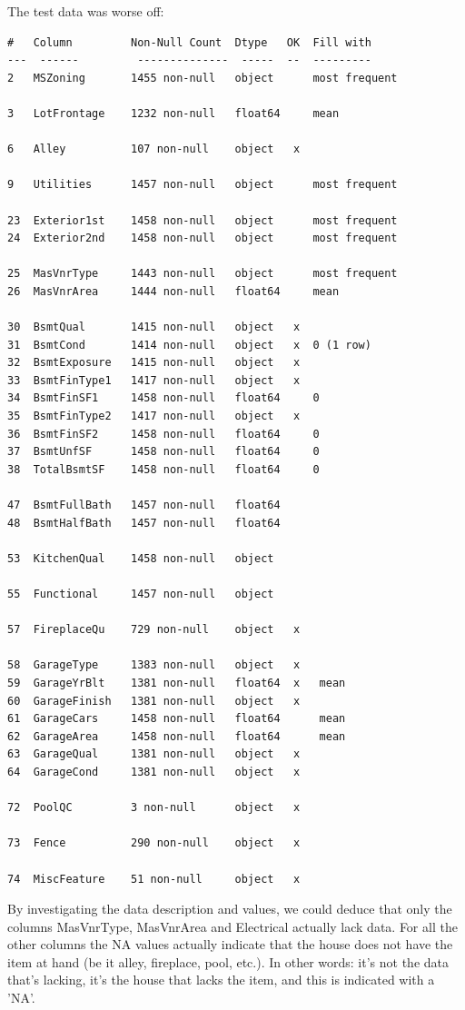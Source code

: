 \documentclass[a4paper, 12pt, twoside]{report}
\begin{document}
The test data was worse off:
\begin{Verbatim}[commandchars=\\\{\}]
#   Column         Non-Null Count  Dtype   OK  Fill with
---  ------         --------------  -----  --  ---------
2   MSZoning       1455 non-null   object      most frequent

3   LotFrontage    1232 non-null   float64     mean

6   Alley          107 non-null    object   x

9   Utilities      1457 non-null   object      most frequent

23  Exterior1st    1458 non-null   object      most frequent
24  Exterior2nd    1458 non-null   object      most frequent

25  MasVnrType     1443 non-null   object      most frequent
26  MasVnrArea     1444 non-null   float64     mean

30  BsmtQual       1415 non-null   object   x
31  BsmtCond       1414 non-null   object   x  0 (1 row)
32  BsmtExposure   1415 non-null   object   x
33  BsmtFinType1   1417 non-null   object   x                          
34  BsmtFinSF1     1458 non-null   float64     0
35  BsmtFinType2   1417 non-null   object   x  
36  BsmtFinSF2     1458 non-null   float64     0
37  BsmtUnfSF      1458 non-null   float64     0
38  TotalBsmtSF    1458 non-null   float64     0

47  BsmtFullBath   1457 non-null   float64
48  BsmtHalfBath   1457 non-null   float64

53  KitchenQual    1458 non-null   object 

55  Functional     1457 non-null   object 

57  FireplaceQu    729 non-null    object   x

58  GarageType     1383 non-null   object   x
59  GarageYrBlt    1381 non-null   float64  x   mean
60  GarageFinish   1381 non-null   object   x  
61  GarageCars     1458 non-null   float64      mean
62  GarageArea     1458 non-null   float64      mean
63  GarageQual     1381 non-null   object   x
64  GarageCond     1381 non-null   object   x
 
72  PoolQC         3 non-null      object   x

73  Fence          290 non-null    object   x

74  MiscFeature    51 non-null     object   x
\end{Verbatim}

By investigating the data description and values, we could deduce that only the columns MasVnrType, MasVnrArea and Electrical actually lack data. For all the other columns the NA values actually indicate that the house does not have the item at hand (be it alley, fireplace, pool, etc.). In other words: it's not the data that's lacking, it's the house that lacks the item, and this is indicated with a 'NA'.
\end{document}
